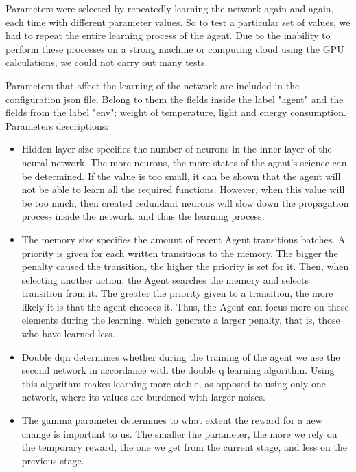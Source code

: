\documentclass{article}
\begin{document}
Parameters were selected by repeatedly learning the network again and again, each time with different parameter values.
So to test a particular set of values, we had to repeat the entire learning process of the agent.
Due to the inability to perform these processes on a strong machine or computing cloud using the GPU calculations,
we could not carry out many tests.

Parameters that affect the learning of the network are included in the configuration json file.
Belong to them the fields inside the label "agent" and the fields from the label "env"; weight of temperature, light and energy consumption.\\

Parameters descriptions:
\begin{itemize}
\item Hidden layer size specifies the number of neurons in the inner layer of the neural network.
The more neurons, the more states of the agent's science can be determined. 
If the value is too small, it can be shown that the agent will not be able to learn all the required functions.
However, when this value will be too much, then created redundant neurons will slow down the propagation process inside the network, and thus the learning process.

\item The memory size specifies the amount of recent Agent transitions batches.
A priority is given for each written transitions to the memory. 
The bigger the penalty caused the transition, the higher the priority is set for it.
Then, when selecting another action, the Agent searches the memory and selects transition from it. 
The greater the priority given to a transition, the more likely it is that the agent chooses it.
Thus, the Agent can focus more on these elements during the learning, 
which generate a larger penalty, that is, those who have learned less.

\item Double dqn determines whether during the training of the agent we use the second network in accordance with the double q learning algorithm.
Using this algorithm makes learning more stable, as opposed to using only one network, where its values are burdened with larger noises.

\item The gamma parameter determines to what extent the reward for a new change is important to us. 
The smaller the parameter, the more we rely on the temporary reward, the one we get from the current stage, and less on the previous stage.


\end{itemize}
\end{document}
